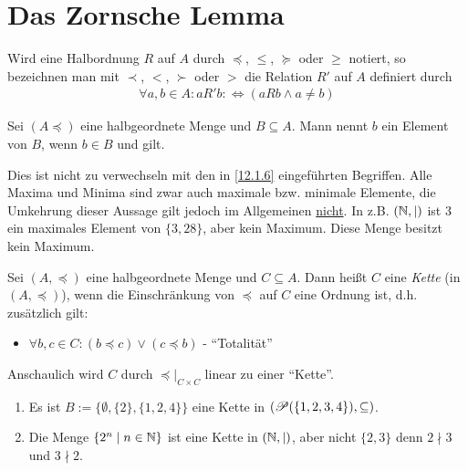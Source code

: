 \documentclass[../../main.tex]{subfiles}
\begin{document}
\section{Das Zornsche Lemma}

\begin{nt}\label{12.2.1} 
	Wird eine Halbordnung $R$ auf $A$ durch $\preceq$, $\le$, $\succeq$ oder $\ge$ notiert, so bezeichnen man mit $\prec$, $<$, $\succ$ oder $>$ die Relation $R'$ auf $A$ definiert durch
	\begin{align*}
		\forall a,b\in A: aR'b:\Longleftrightarrow (aRb\land a\neq b)
	\end{align*}
\end{nt}	

\begin{df}\label{12.2.2} 
	Sei $(A\preceq)$ eine halbgeordnete Menge und $B\subseteq A$. Mann nennt $b$ ein   Element von $B$, wenn $b\in B$ und  gilt.
\end{df}

\begin{bem}\label{12.2.3} 
	Dies ist nicht zu verwechseln mit den in \ref{12.1.6} eingeführten Begriffen. Alle Maxima und Minima sind zwar auch maximale bzw. minimale Elemente, die Umkehrung dieser Aussage gilt jedoch im Allgemeinen \underline{nicht}. In z.B. $(\mathbb N,\mid)$ ist $3$ ein maximales Element von $\{3,28\}$, aber kein Maximum. Diese Menge besitzt kein Maximum.
\end{bem}
		
\begin{df}\label{12.2.4}
	Sei $(A,\preceq)$ eine halbgeordnete Menge und $C\subseteq A$. Dann heißt $C$ eine \emph{Kette} (in $(A,\preceq)$), wenn die Einschränkung von $\preceq$ auf $C$ eine Ordnung ist, d.h. zusätzlich gilt:
	\begin{itemize}
		\item $\forall b,c\in C: (b\preceq c)\lor(c\preceq b)$ - \enquote{Totalität}
	\end{itemize}
	Anschaulich wird $C$ durch $\preceq\vert_{C\times C}$ linear zu einer \enquote{Kette}.
\end{df}
		
\begin{bsp}\label{12.2.5}
	\begin{enumerate}[\normalfont(a)]
		\item Es ist $B:=\{\emptyset,\{2\},\{1,2,4\}\}$ eine Kette in $(\mathcal P(\{1,2,3,4\}),\subseteq)$.
		\item Die Menge $\{2^n\mid n\in\mathbb N\}$ ist eine Kette in $(\mathbb N,\mid)$, aber nicht $\{2,3\}$ denn $2\nmid 3$ und $3\nmid 2$.
	\end{enumerate}
\end{bsp}
\end{document}
